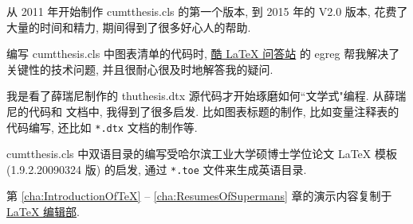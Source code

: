 \documentclass[preprint,authoryear,PhD]{cumtthesis}
\begin{document}
\frontmatter

















\makecover

\begin{acknowledgements}
  从 2011 年开始制作 cumtthesis.cls 的第一个版本, 到 2015 年的 V2.0 版本, 花费了大量的时间和精力, 期间得到了很多好心人的帮助.

  编写 cumtthesis.cls 中图表清单的代码时, \href{http://tex.stackexchange.com/}{酷 \LaTeX{} 问答站} 的 egreg
  帮我解决了关键性的技术问题, 并且很耐心很及时地解答我的疑问.

  我是看了薛瑞尼制作的 thuthesis.dtx 源代码才开始琢磨如何``文学式"编程. 从薛瑞尼的代码和
  文档中, 我得到了很多启发. 比如图表标题的制作, 比如变量注释表的代码编写, 还比如
  \verb|*.dtx| 文档的制作等.

  cumtthesis.cls 中双语目录的编写受哈尔滨工业大学硕博士学位论文 \LaTeX{} 模板 (1.9.2.20090324 版) 的启发,
  通过 \verb|*.toe| 文件来生成英语目录.

  第 \ref{cha:IntroductionOfTeX} --  \ref{cha:ResumesOfSupermans} 章的演示内容复制于
  \href{http://zzg34b.w3.c361.com/}{\LaTeX{} 编辑部}.
\end{acknowledgements}
\end{document}
